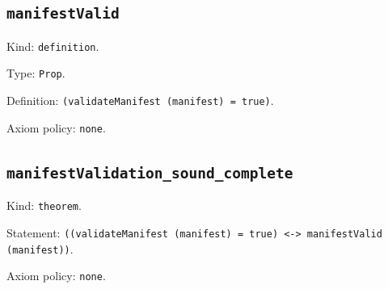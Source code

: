 \documentclass[11pt]{article}
\begin{document}
\subsection*{\texttt{manifestValid}}
\noindent Kind: \texttt{definition}.\par
\noindent Type: \texttt{Prop}.\par
\noindent Definition: \texttt{(validateManifest (manifest) = true)}.\par
\noindent Axiom policy: \texttt{none}.\par
\subsection*{\texttt{manifestValidation\_sound\_complete}}
\noindent Kind: \texttt{theorem}.\par
\noindent Statement: \texttt{((validateManifest (manifest) = true) <-> manifestValid (manifest))}.\par
\noindent Axiom policy: \texttt{none}.\par
\end{document}
